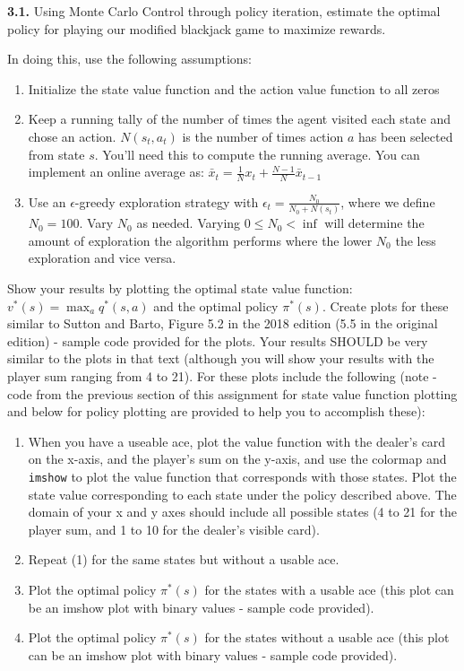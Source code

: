 \documentclass[
  letterpaper,
  DIV=11,
  numbers=noendperiod]{scrartcl}
\providecommand{\tightlist}{%
  \setlength{\itemsep}{0pt}\setlength{\parskip}{0pt}}\usepackage{longtable,booktabs,array}
\begin{document}
\textbf{3.1.} Using Monte Carlo Control through policy iteration,
estimate the optimal policy for playing our modified blackjack game to
maximize rewards.

In doing this, use the following assumptions:

\begin{enumerate}
\def\labelenumi{\arabic{enumi}.}
\tightlist
\item
  Initialize the state value function and the action value function to
  all zeros
\item
  Keep a running tally of the number of times the agent visited each
  state and chose an action. \(N(s_t,a_t)\) is the number of times
  action \(a\) has been selected from state \(s\). You'll need this to
  compute the running average. You can implement an online average as:
  \(\bar{x}_{t} = \frac{1}{N}x_t + \frac{N-1}{N}\bar{x}_{t-1}\)
\item
  Use an \(\epsilon\)-greedy exploration strategy with
  \(\epsilon_t = \frac{N_0}{N_0 + N(s_t)}\), where we define
  \(N_0 = 100\). Vary \(N_0\) as needed. Varying \(0 \leq N_0 < \inf\)
  will determine the amount of exploration the algorithm performs where
  the lower \(N_0\) the less exploration and vice versa.
\end{enumerate}

Show your results by plotting the optimal state value function:
\(v^*(s) = \max_a q^*(s,a)\) and the optimal policy \(\pi^*(s)\). Create
plots for these similar to Sutton and Barto, Figure 5.2 in the 2018
edition (5.5 in the original edition) - sample code provided for the
plots. Your results SHOULD be very similar to the plots in that text
(although you will show your results with the player sum ranging from 4
to 21). For these plots include the following (note - code from the
previous section of this assignment for state value function plotting
and below for policy plotting are provided to help you to accomplish
these):

\begin{enumerate}
\def\labelenumi{\arabic{enumi}.}
\tightlist
\item
  When you have a useable ace, plot the value function with the dealer's
  card on the x-axis, and the player's sum on the y-axis, and use the
  colormap and \texttt{imshow} to plot the value function that
  corresponds with those states. Plot the state value corresponding to
  each state under the policy described above. The domain of your x and
  y axes should include all possible states (4 to 21 for the player sum,
  and 1 to 10 for the dealer's visible card).
\item
  Repeat (1) for the same states but without a usable ace.
\item
  Plot the optimal policy \(\pi^*(s)\) for the states with a usable ace
  (this plot can be an imshow plot with binary values - sample code
  provided).
\item
  Plot the optimal policy \(\pi^*(s)\) for the states without a usable
  ace (this plot can be an imshow plot with binary values - sample code
  provided).
\end{enumerate}
\end{document}
